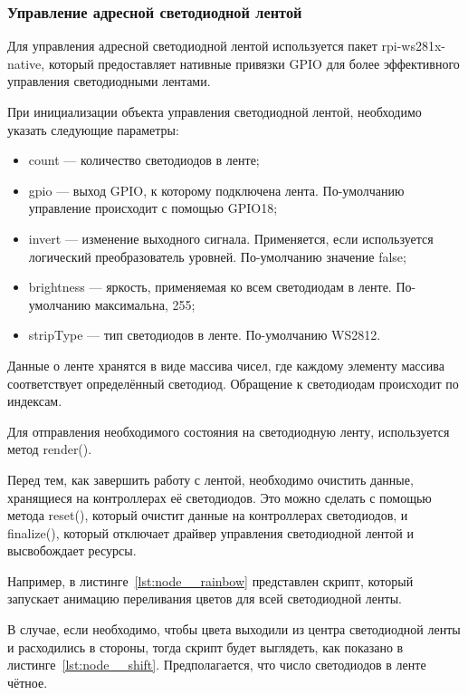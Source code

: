 \subsubsection{Управление адресной светодиодной лентой}

Для управления адресной светодиодной лентой используется пакет rpi-ws281x-native, который предоставляет нативные привязки GPIO для более эффективного управления светодиодными лентами.

При инициализации объекта управления светодиодной лентой, необходимо указать следующие параметры:

\begin{itemize}
  \item count --- количество светодиодов в ленте;
  \item gpio --- выход GPIO, к которому подключена лента. По-умолчанию управление происходит с помощью GPIO18;
  \item invert --- изменение выходного сигнала. Применяется, если используется логический преобразователь уровней. По-умолчанию значение false;
  \item brightness --- яркость, применяемая ко всем светодиодам в ленте. По-умолчанию максимальна, 255;
  \item stripType --- тип светодиодов в ленте. По-умолчанию WS2812.
\end{itemize}

Данные о ленте хранятся в виде массива чисел, где каждому элементу массива соответствует определённый светодиод. Обращение к светодиодам происходит по индексам.

Для отправления необходимого состояния на светодиодную ленту, используется метод render().

Перед тем, как завершить работу с лентой, необходимо очистить данные, хранящиеся на контроллерах её светодиодов. Это можно сделать с помощью метода reset(), который очистит данные на контроллерах светодиодов, и finalize(), который отключает драйвер управления светодиодной лентой и высвобождает ресурсы.

Например, в листинге~\ref{lst:node__rainbow} представлен скрипт, который запускает анимацию переливания цветов для всей светодиодной ленты.



В случае, если необходимо, чтобы цвета выходили из центра светодиодной ленты и расходились в стороны, тогда скрипт будет выглядеть, как показано в листинге~\ref{lst:node__shift}. Предполагается, что число светодиодов в ленте чётное.

